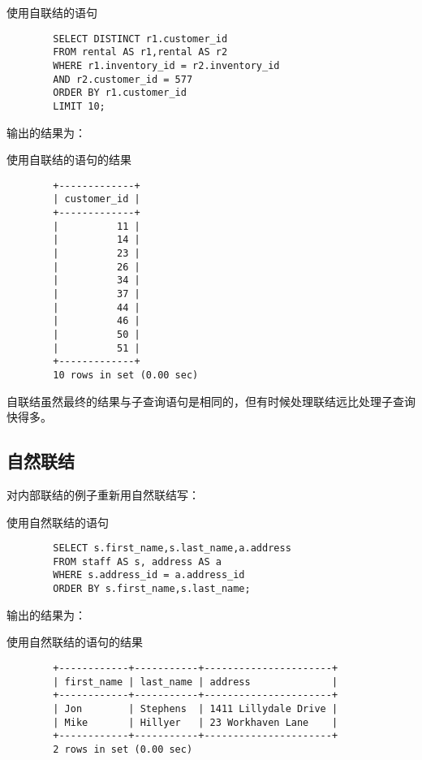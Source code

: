 \documentclass[UTF8]{article}
\begin{document}
\begin{listing}[H]
        \caption{使用自联结的语句}
	\label{code:useselfjoinclause}
\begin{verbatim}
        SELECT DISTINCT r1.customer_id 
        FROM rental AS r1,rental AS r2 
        WHERE r1.inventory_id = r2.inventory_id 
        AND r2.customer_id = 577 
        ORDER BY r1.customer_id
        LIMIT 10; 
\end{verbatim}
\end{listing}

输出的结果为：

\begin{listing}[H]
	\caption{使用自联结的语句的结果}
	\label{code:useselfjoinclauseresult}
\begin{verbatim}
        +-------------+
        | customer_id |
        +-------------+
        |          11 |
        |          14 |
        |          23 |
        |          26 |
        |          34 |
        |          37 |
        |          44 |
        |          46 |
        |          50 |
        |          51 |
        +-------------+
        10 rows in set (0.00 sec)
\end{verbatim}
\end{listing}

\begin{orangebox}[frametitle={Tips 16.2.1 用自联结而不用子查询 }]
        自联结虽然最终的结果与子查询语句是相同的，但有时候处理联结远比处理子查询快得多。
\end{orangebox} 

\subsection{自然联结}

对内部联结的例子重新用自然联结写：
\begin{listing}[H]
        \caption{使用自然联结的语句}
	\label{code:usenatualjoinclause}
\begin{verbatim}
        SELECT s.first_name,s.last_name,a.address 
        FROM staff AS s, address AS a
        WHERE s.address_id = a.address_id 
        ORDER BY s.first_name,s.last_name;
\end{verbatim}
\end{listing}

输出的结果为：

\begin{listing}[H]
	\caption{使用自然联结的语句的结果}
	\label{code:usenatualjoinclauseresult}
\begin{verbatim}
        +------------+-----------+----------------------+
        | first_name | last_name | address              |
        +------------+-----------+----------------------+
        | Jon        | Stephens  | 1411 Lillydale Drive |
        | Mike       | Hillyer   | 23 Workhaven Lane    |
        +------------+-----------+----------------------+
        2 rows in set (0.00 sec)
\end{verbatim}
\end{listing}
\end{document}
